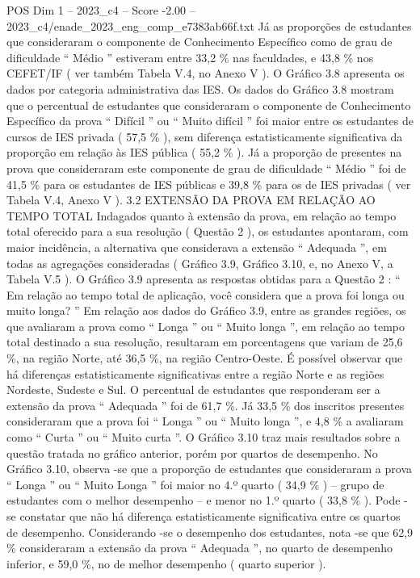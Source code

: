 \begin{textsample}{POS Dim 1 – 2023\_c4 – Score -2.00 – 2023\_c4/enade\_2023\_eng\_comp\_e7383ab66f.txt}
Já as proporções de estudantes que consideraram o componente de Conhecimento Específico como de grau de dificuldade “ Médio ” estiveram entre 33,2 \% nas faculdades, e 43,8 \% nos CEFET/IF ( ver também Tabela V.4, no Anexo V ).
O Gráfico 3.8 apresenta os dados por categoria administrativa das IES.
Os dados do Gráfico 3.8 mostram que o percentual de estudantes que consideraram o componente de Conhecimento Específico da prova “ Difícil ” ou “ Muito difícil ” foi maior entre os estudantes de cursos de IES privada ( 57,5 \% ), sem diferença estatisticamente significativa da proporção em relação às IES pública ( 55,2 \% ).
Já a proporção de presentes na prova que consideraram este componente de grau de dificuldade “ Médio ” foi de 41,5 \% para os estudantes de IES públicas e 39,8 \% para os de IES privadas ( ver Tabela V.4, Anexo V ). 3.2 EXTENSÃO DA PROVA EM RELAÇÃO AO TEMPO TOTAL Indagados quanto à extensão da prova, em relação ao tempo total oferecido para a sua resolução ( Questão 2 ), os estudantes apontaram, com maior incidência, a alternativa que considerava a extensão “ Adequada ”, em todas as agregações consideradas ( Gráfico 3.9, Gráfico 3.10, e, no Anexo V, a Tabela V.5 ).
O Gráfico 3.9 apresenta as respostas obtidas para a Questão 2 : “ Em relação ao tempo total de aplicação, você considera que a prova foi longa ou muito longa? ” Em relação aos dados do Gráfico 3.9, entre as grandes regiões, os que avaliaram a prova como “ Longa ” ou “ Muito longa ”, em relação ao tempo total destinado a sua resolução, resultaram em porcentagens que variam de 25,6 \%, na região Norte, até 36,5 \%, na região Centro-Oeste.
É possível observar que há diferenças estatisticamente significativas entre a região Norte e as regiões Nordeste, Sudeste e Sul.
O percentual de estudantes que responderam ser a extensão da prova “ Adequada ” foi de 61,7 \%.
Já 33,5 \% dos inscritos presentes consideraram que a prova foi “ Longa ” ou “ Muito longa ”, e 4,8 \% a avaliaram como “ Curta ” ou “ Muito curta ”.
O Gráfico 3.10 traz mais resultados sobre a questão tratada no gráfico anterior, porém por quartos de desempenho.
No Gráfico 3.10, observa -se que a proporção de estudantes que consideraram a prova “ Longa ” ou “ Muito Longa ” foi maior no 4.º quarto ( 34,9 \% ) – grupo de estudantes com o melhor desempenho – e menor no 1.º quarto ( 33,8 \% ).
Pode -se constatar que não há diferença estatisticamente significativa entre os quartos de desempenho.
Considerando -se o desempenho dos estudantes, nota -se que 62,9 \% consideraram a extensão da prova “ Adequada ”, no quarto de desempenho inferior, e 59,0 \%, no de melhor desempenho ( quarto superior ).

\end{textsample}
